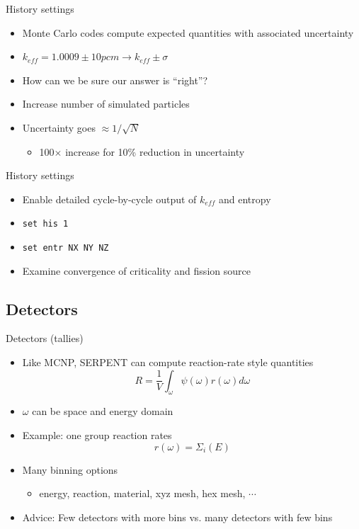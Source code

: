 \documentclass{beamer}
\begin{document}
\begin{frame}{History settings}
    \begin{itemize}
        \item Monte Carlo codes compute expected quantities with associated uncertainty
        \item $k_{eff}=1.0009\pm 10 pcm \rightarrow k_{eff} \pm \sigma$
        \item How can we be sure our answer is ``right''?
        \item Increase number of simulated particles
        \item Uncertainty goes $\approx 1/\sqrt{N}$
        \begin{itemize}
            \item 100$\times$ increase for 10\% reduction in uncertainty
        \end{itemize}
    \end{itemize}
\end{frame}

\begin{frame}{History settings}
    \begin{itemize}
        \item Enable detailed cycle-by-cycle output of $k_{eff}$ and entropy
        \item \texttt{set his 1}
        \item \texttt{set entr NX NY NZ}
        \item Examine convergence of criticality and fission source
    \end{itemize}
\end{frame}

\subsection{Detectors}
\begin{frame}{Detectors (tallies)}
    \begin{itemize}
        \item Like MCNP, SERPENT can compute reaction-rate style quantities
        \begin{equation}
            R = \frac{1}{V}\int_\omega\psi(\omega)r(\omega)d\omega
        \end{equation}
        \item $\omega$ can be space and energy domain
        \item Example: one group reaction rates
        \begin{equation}
            r(\omega) = \Sigma_i(E)
        \end{equation}
        \item Many binning options
        \begin{itemize}
            \item energy, reaction, material, xyz mesh, hex mesh, $\cdots$
        \end{itemize}
        \item{Advice: Few detectors with more bins vs. many detectors with few bins}
    \end{itemize}
\end{frame}
\end{document}
